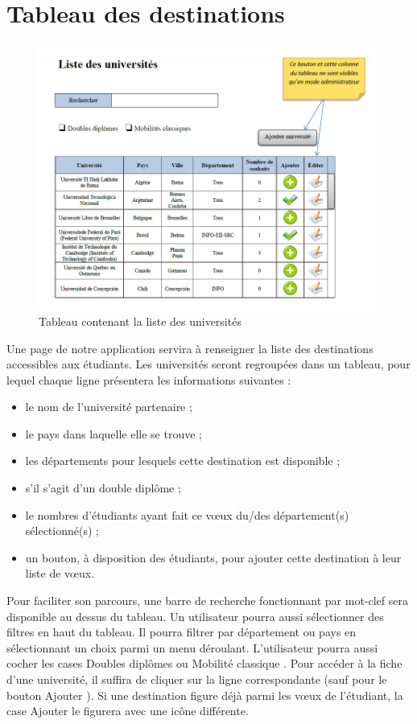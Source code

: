 \section{Tableau des destinations}
\label{sec::list_univ}

\begin{figure}[h!]
	\centering
	\includegraphics[scale=0.7]{Universites/listeUnivs.png}
	\caption{Tableau contenant la liste des universités}
\end{figure}

\newpage

Une page de notre application servira à renseigner la liste des destinations accessibles aux étudiants.
Les universités seront regroupées dans un tableau, pour lequel chaque ligne présentera les informations suivantes :
 \begin{itemize}
 	\item le nom de l'université partenaire ;
 	\item le pays dans laquelle elle se trouve ;
 	\item les départements pour lesquels cette destination est disponible ;
 	\item s'il s'agit d'un double diplôme ;
 	\item le nombres d'étudiants ayant fait ce vœux du/des département(s) sélectionné(s) ;
 	\item un bouton, à disposition des étudiants, pour ajouter cette destination à leur liste de vœux.
 \end{itemize}
 
Pour faciliter son parcours, une barre de recherche fonctionnant par mot-clef sera disponible au dessus du tableau. Un utilisateur pourra aussi sélectionner des filtres en haut du tableau. Il pourra filtrer par département ou pays en sélectionnant un choix parmi un menu déroulant. L'utilisateur pourra aussi cocher les cases \og Doubles diplômes\fg{} ou \og Mobilité classique \fg{}. Pour accéder à la fiche d'une université, il suffira de cliquer sur la ligne correspondante (sauf pour le bouton \og Ajouter \fg{}). Si une destination figure déjà parmi les vœux de l'étudiant, la case \og Ajouter \fg{} le figurera avec une icône différente.

